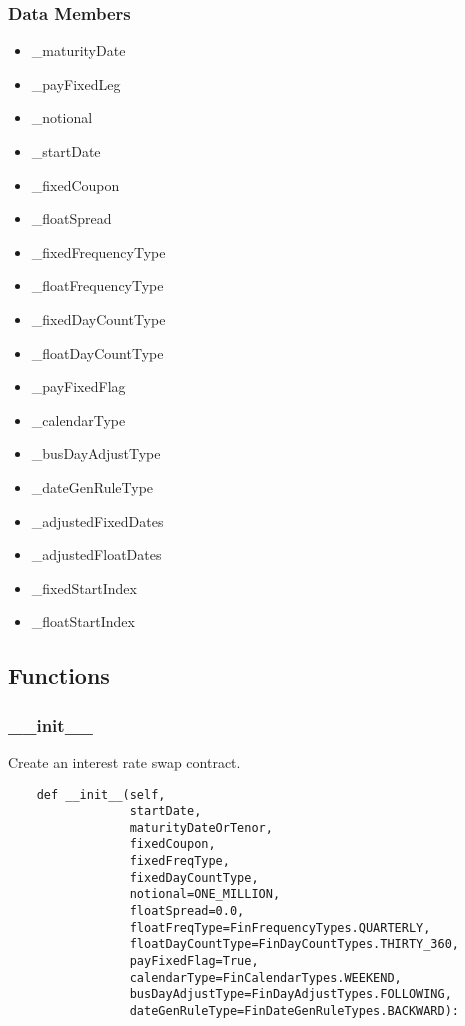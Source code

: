 \documentclass[twoside,11pt]{book}
\begin{document}
\subsubsection*{Data Members}
\begin{itemize}
\item{\_maturityDate}
\item{\_payFixedLeg}
\item{\_notional}
\item{\_startDate}
\item{\_fixedCoupon}
\item{\_floatSpread}
\item{\_fixedFrequencyType}
\item{\_floatFrequencyType}
\item{\_fixedDayCountType}
\item{\_floatDayCountType}
\item{\_payFixedFlag}
\item{\_calendarType}
\item{\_busDayAdjustType}
\item{\_dateGenRuleType}
\item{\_adjustedFixedDates}
\item{\_adjustedFloatDates}
\item{\_fixedStartIndex}
\item{\_floatStartIndex}
\end{itemize}

\subsection*{Functions}

\subsubsection*{{\bf \_\_init\_\_}}
Create an interest rate swap contract.  

\begin{lstlisting}
    def __init__(self,
                 startDate,
                 maturityDateOrTenor,
                 fixedCoupon,
                 fixedFreqType,
                 fixedDayCountType,
                 notional=ONE_MILLION,
                 floatSpread=0.0,
                 floatFreqType=FinFrequencyTypes.QUARTERLY,
                 floatDayCountType=FinDayCountTypes.THIRTY_360,
                 payFixedFlag=True,
                 calendarType=FinCalendarTypes.WEEKEND,
                 busDayAdjustType=FinDayAdjustTypes.FOLLOWING,
                 dateGenRuleType=FinDateGenRuleTypes.BACKWARD):
\end{lstlisting}
\end{document}
